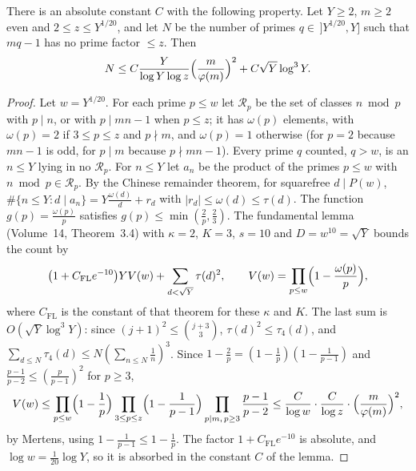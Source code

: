 \begin{lemma}\label{lem:siftedprimes}
There is an absolute constant $C$ with the following property. Let $Y\ge2$, $m\ge2$ even and $2\le z\le Y^{1/20}$, and let $N$ be the number of primes $q\in\,]Y^{1/20},Y]$ such that $mq-1$ has no prime factor $\le z$. Then
\[
N\le C\frac{Y}{\log Y\log z}\Bigl(\frac m{\varphi(m)}\Bigr)^2+C\sqrt Y\log^3Y.
\]
\end{lemma}
\begin{proof}
Let $w=Y^{1/20}$. For each prime $p\le w$ let $\mathcal R_p$ be the set of classes $n\bmod p$ with $p\mid n$, or with $p\mid mn-1$ when $p\le z$; it has $\omega(p)$ elements, with $\omega(p)=2$ if $3\le p\le z$ and $p\nmid m$, and $\omega(p)=1$ otherwise (for $p=2$ because $mn-1$ is odd, for $p\mid m$ because $p\nmid mn-1$). Every prime $q$ counted, $q>w$, is an $n\le Y$ lying in no $\mathcal R_p$. For $n\le Y$ let $a_n$ be the product of the primes $p\le w$ with $n\bmod p\in\mathcal R_p$. By the Chinese remainder theorem, for squarefree $d\mid P(w)$, $\#\{n\le Y:d\mid a_n\}=Y\frac{\omega(d)}d+r_d$ with $|r_d|\le\omega(d)\le\tau(d)$. The function $g(p)=\frac{\omega(p)}p$ satisfies $g(p)\le\min(\frac2p,\frac23)$. The fundamental lemma (Volume~14, Theorem~3.4) with $\kappa=2$, $K=3$, $s=10$ and $D=w^{10}=\sqrt Y$ bounds the count by
\[
\bigl(1+C_{\mathrm{FL}}e^{-10}\bigr)YV(w)+\sum_{d<\sqrt Y}\tau(d)^2,\qquad V(w)=\prod_{p\le w}\Bigl(1-\frac{\omega(p)}p\Bigr),
\]
where $C_{\mathrm{FL}}$ is the constant of that theorem for these $\kappa$ and $K$. The last sum is $O(\sqrt Y\log^3Y)$: since $(j+1)^2\le\binom{j+3}3$, $\tau(d)^2\le\tau_4(d)$, and $\sum_{d\le N}\tau_4(d)\le N(\sum_{n\le N}\frac1n)^3$. Since $1-\frac2p=(1-\frac1p)(1-\frac1{p-1})$ and $\frac{p-1}{p-2}\le(\frac p{p-1})^2$ for $p\ge3$,
\[
V(w)\le\prod_{p\le w}\Bigl(1-\frac1p\Bigr)\prod_{3\le p\le z}\Bigl(1-\frac1{p-1}\Bigr)\prod_{p\mid m,\,p\ge3}\frac{p-1}{p-2}\le\frac C{\log w}\cdot\frac C{\log z}\cdot\Bigl(\frac m{\varphi(m)}\Bigr)^2,
\]
by Mertens, using $1-\frac1{p-1}\le1-\frac1p$. The factor $1+C_{\mathrm{FL}}e^{-10}$ is absolute, and $\log w=\frac1{20}\log Y$, so it is absorbed in the constant $C$ of the lemma.
\end{proof}

